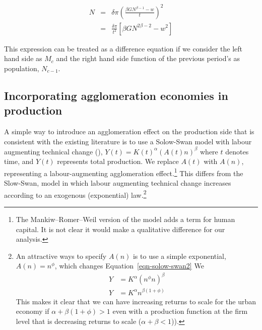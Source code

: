 \begin{eqnarray}
    N&=&\delta\pi (\frac{\beta GN^{\beta-1}-w}{t})^2\\
    &=&\frac{\delta\pi }{t^2} \left[\beta GN^{2\beta-2} -w^2\right]
\end{eqnarray}

This expression can be treated as a difference equation if we consider the left hand side as $M_{c}$ and the right hand side  function of the previous period's as population, $N_{{c}-1}$.



\subsection{Incorporating agglomeration economies in production} \label{section-agglomeration-production}
A simple way  to introduce an agglomeration effect on the production side that is consistent with the existing literature is  to use a \gls{Solow-Swan model} with labour augmenting technical change (\cite{solowContributionTheoryEconomic1956, swanEconomicGrowthCapital1956}), $Y(t)=K(t)^{\alpha }(A(t)n)^{\beta }$ where $t$ denotes time,  %
 and $Y (t )$  represents total production. 
We %
 replace $A(t)$ %
  with $A(n)$, representing a labour-augmenting agglomeration effect.\footnote{The Mankiw--Romer--Weil version of the model adds a term for human capital.  It is not clear it would make a qualitative difference for our analysis.}  This differs from  the Slow-Swan, model in which labour augmenting technical change increases according to an exogenous (exponential) law.\footnote{An attractive ways to specify $A(n)$  is to use a simple exponential, $A(n)=n^\phi$, which changes Equation~\ref{eqn-solow-swan2} 
  We %
\begin{eqnarray}
 Y&=K^{\alpha }(n^{\phi }n)^{\beta}  \nonumber\\
 Y&=K^{\alpha }n^{\beta(1 +\phi)}
\label{eqn-solow-swan1}
\end{eqnarray}
This makes it clear that we can have increasing returns to scale for the urban economy if  $\alpha + \beta(1+ \phi)>1$ even with a production function at the firm level that is decreasing returns to scale ($\alpha +\beta<1$)).\label{footnote-psi}}  
  
